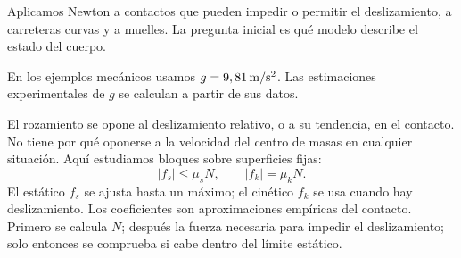 \documentclass[11pt,a4paper]{article}
\begin{document}
\shorthandoff{<>}
\color{Ink}
Aplicamos Newton a contactos que pueden impedir o permitir el deslizamiento,
a carreteras curvas y a muelles. La pregunta inicial es qu\'e modelo describe
el estado del cuerpo.
\begin{lessonindex}
\end{lessonindex}
En los ejemplos mec\'anicos usamos $g=9,81\,\mathrm{m/s^2}$. Las estimaciones experimentales de
$g$ se calculan a partir de sus datos.
\precisionnote

El rozamiento se opone al deslizamiento relativo, o a su tendencia, en el contacto.
No tiene por qu\'e oponerse a la velocidad del centro de masas en cualquier situaci\'on.
Aqu\'i estudiamos bloques sobre superficies fijas:
\[
|f_s|\le\mu_sN,\qquad |f_k|=\mu_kN.
\]
El est\'atico $f_s$ se ajusta hasta un m\'aximo; el cin\'etico $f_k$ se usa
cuando hay deslizamiento. Los coeficientes son aproximaciones emp\'iricas del contacto.
Primero se calcula $N$; despu\'es la fuerza necesaria para impedir el deslizamiento;
solo entonces se comprueba si cabe dentro del l\'imite est\'atico.
\end{document}
